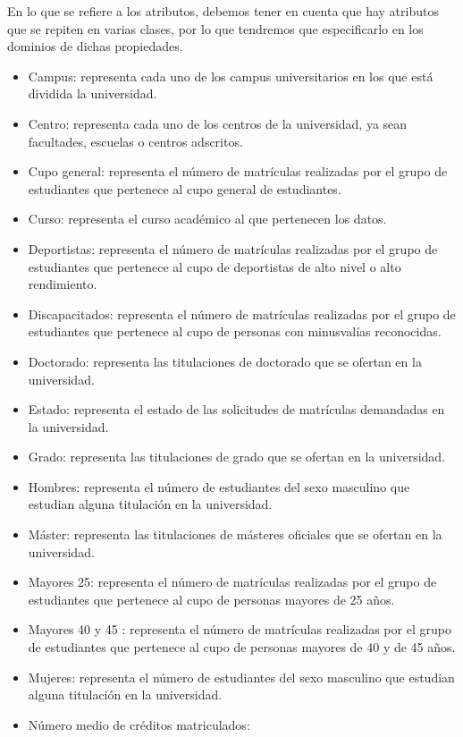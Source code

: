 En lo que se refiere a los atributos, debemos tener en cuenta que hay atributos que se repiten en varias clases, por lo que tendremos que especificarlo en los dominios de dichas propiedades.

\begin{itemize}
	\item Campus: representa cada uno de los campus universitarios en los que está dividida la universidad.
	\item Centro: representa cada uno de los centros de la universidad, ya sean facultades, escuelas o centros adscritos.
	\item Cupo general: representa el número de matrículas realizadas por el grupo de estudiantes que pertenece al cupo general de estudiantes.
	\item Curso: representa el curso académico al que pertenecen los datos.
	\item Deportistas: representa el número de matrículas realizadas por el grupo de estudiantes que pertenece al cupo de deportistas de alto nivel o alto rendimiento.
	\item Discapacitados: representa el número de matrículas realizadas por el grupo de estudiantes que pertenece al cupo de personas con minusvalías reconocidas.
	\item Doctorado: representa las titulaciones de doctorado que se ofertan en la universidad.
	\item Estado: representa el estado de las solicitudes de matrículas demandadas en la universidad.
	\item Grado: representa las titulaciones de grado que se ofertan en la universidad.
	\item Hombres: representa el número de estudiantes del sexo masculino que estudian alguna titulación en la universidad.
	\item Máster: representa las titulaciones de másteres oficiales que se ofertan en la universidad.
	\item Mayores 25: representa el número de matrículas realizadas por el grupo de estudiantes que pertenece al cupo de personas mayores de 25 años.
	\item Mayores 40 y 45 : representa el número de matrículas realizadas por el grupo de estudiantes que pertenece al cupo de personas mayores de 40 y de 45 años.
	\item Mujeres: representa el número de estudiantes del sexo masculino que estudian alguna titulación en la universidad.
	\item Número medio de créditos matriculados:

\end{itemize}
